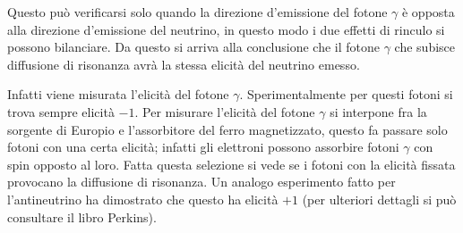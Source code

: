 Questo può verificarsi solo quando la direzione d'emissione del fotone $\gamma$ è opposta alla direzione d'emissione del neutrino, in questo modo
i due effetti di rinculo si possono bilanciare. Da questo si arriva alla conclusione che il fotone $\gamma$ che subisce diffusione di risonanza avrà la stessa elicità del neutrino
emesso.
\begin{figure}[!htbp]
\centering
\caption{}
\end{figure}

Infatti viene misurata l'elicità del fotone $\gamma$. Sperimentalmente per questi fotoni si trova sempre elicità $-1$. Per misurare l'elicità del fotone $\gamma$ si interpone
fra la sorgente di Europio e l'assorbitore del ferro magnetizzato, questo fa passare solo fotoni con una certa elicità; infatti gli elettroni possono assorbire fotoni $\gamma$
con spin opposto al loro. Fatta questa selezione si vede se i fotoni con la elicità fissata provocano la diffusione di risonanza.
Un analogo esperimento fatto per l'antineutrino ha dimostrato che questo ha elicità $+1$ (per ulteriori dettagli si può consultare il libro Perkins).

